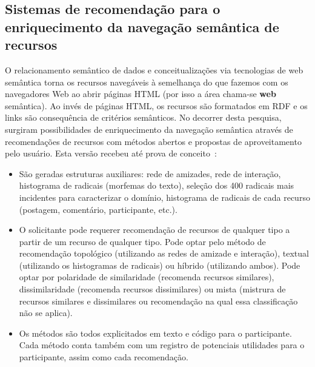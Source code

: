 \documentclass[a4paper,openright,12pt]{report} %
\begin{document}
\subsection{Sistemas de recomendação para o enriquecimento da navegação semântica de recursos}
O relacionamento semântico de dados e conceitualizações via tecnologias de web semântica 
torna os recursos navegáveis à semelhança do que fazemos com os navegadores Web
ao abrir páginas HTML (por isso a área chama-se {\bf web} semântica).
Ao invés de páginas HTML, os recursos são formatados em RDF e os links são
consequência de critérios semânticos.
No decorrer desta pesquisa, surgiram possibilidades de enriquecimento
da navegação semântica através de recomendações de recursos com
métodos abertos e propostas de aproveitamento pelo usuário.
Esta versão recebeu até prova de conceito~\cite{pnud4}:
\begin{itemize}
	\item São geradas estruturas auxiliares: rede de amizades, rede de interação, histograma de radicais (morfemas do texto),
		seleção dos 400 radicais
		mais incidentes para caracterizar o domínio,
		histograma de radicais de cada recurso 
		(postagem, comentário, participante, etc.).
	\item O solicitante pode requerer recomendação de recursos
		de qualquer tipo a partir de um recurso de qualquer
		tipo. Pode optar pelo método de recomendação topológico (utilizando as redes de amizade e interação),
		textual (utilizando os histogramas de radicais) ou híbrido (utilizando ambos).
		Pode optar por polaridade de similaridade (recomenda recursos similares),
		dissimilaridade (recomenda recursos dissimilares) ou
		mista (mistrura de recursos similares e dissimilares ou recomendação na qual essa classificação não se aplica).
	\item Os métodos são todos explicitados em texto e código
		para o participante. Cada método conta também com um
		registro de potenciais utilidades para o participante,
		assim como cada recomendação.
\end{itemize}
\end{document}
